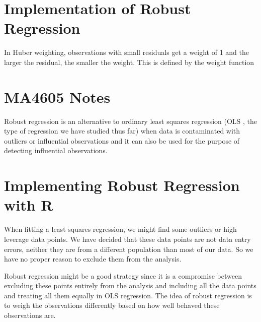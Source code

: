 \section{Implementation of Robust Regression}


%

In Huber weighting, observations with small residuals get a weight of 1 and the larger the residual, 
the smaller the weight. This is defined by the weight function 

\section{MA4605 Notes}
Robust regression is an alternative to ordinary least squares regression (OLS , the type of regression 
we have studied thus far) when data is contaminated with outliers or influential observations and it 
can also be used for the purpose of detecting influential observations. 



\section{Implementing Robust Regression with R}

When fitting a least squares regression, we might find some outliers or high leverage data points. 
We have decided that these data points are not data entry errors, neither they are from a different 
population than most of our data. So we have no proper reason to exclude them from the analysis. 

Robust regression might be a good strategy since it is a compromise between excluding these points 
entirely from the analysis and including all the data points and treating all them equally in OLS 
regression. The idea of robust regression is to weigh the observations differently based on how well 
behaved these observations are. 



 


